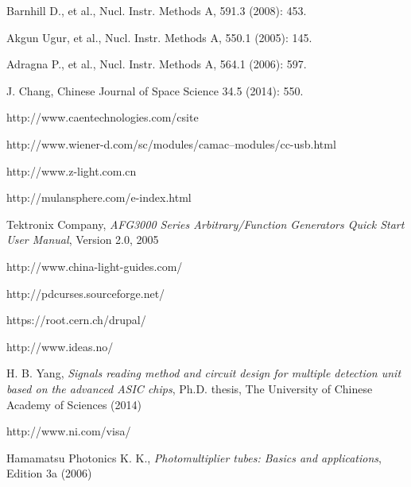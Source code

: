 \documentclass[a4paper,10pt,twoside]{cpc-hepnp}
\begin{document}
\begin{multicols}{2}

\begin{thebibliography}{90}

\vspace{3mm}
Barnhill D., et al., Nucl. Instr. Methods A, 591.3 (2008): 453.

Akgun Ugur, et al., Nucl. Instr. Methods A, 550.1 (2005): 145.

Adragna P., et al., Nucl. Instr. Methods A, 564.1 (2006): 597.

J. Chang, Chinese Journal of Space Science 34.5 (2014): 550.

http://www.caentechnologies.com/csite

http://www.wiener-d.com/sc/modules/camac--modules/cc-usb.html

http://www.z-light.com.cn

http://mulansphere.com/e-index.html

Tektronix Company, \emph{AFG3000 Series Arbitrary/Function Generators Quick Start User Manual}, Version 2.0, 2005

http://www.china-light-guides.com/

http://pdcurses.sourceforge.net/

https://root.cern.ch/drupal/

http://www.ideas.no/

H. B. Yang, \emph{Signals reading method and circuit design for multiple detection
unit based on the advanced ASIC chips}, Ph.D. thesis, The University of Chinese
Academy of Sciences (2014)


http://www.ni.com/visa/

Hamamatsu Photonics K. K., \emph{Photomultiplier tubes: Basics and applications},  Edition 3a (2006)

\end{thebibliography}
\end{multicols}
\end{document}
